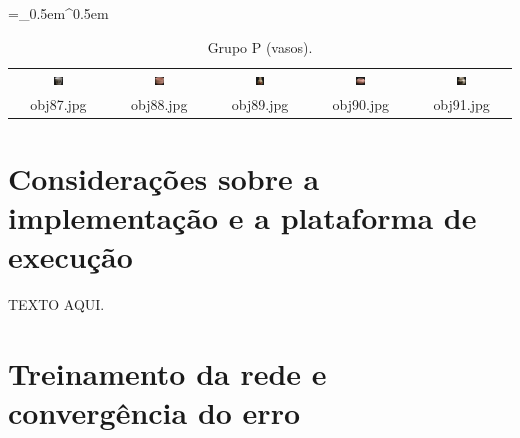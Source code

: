 \begin{table}[H]
  \centering
  \caption{Grupo P (vasos).}
  \tabulinesep =_0.5em^0.5em
  \everyrow{\tabucline[0.4pt]-}
  \begin{tabu}{|ccccc|}
    \includegraphics[width=0.1\textwidth,height=0.1\textwidth]{imagens/coil_100/vasos/obj18__0.png} &
    \includegraphics[width=0.1\textwidth,height=0.1\textwidth]{imagens/coil_100/vasos/obj25__0.png} &
    \includegraphics[width=0.1\textwidth,height=0.1\textwidth]{imagens/coil_100/vasos/obj30__0.png} &
    \includegraphics[width=0.1\textwidth,height=0.1\textwidth]{imagens/coil_100/vasos/obj56__0.png} &
    \includegraphics[width=0.1\textwidth,height=0.1\textwidth]{imagens/coil_100/vasos/obj58__0.png}
    \\
    \scriptsize{obj87.jpg} & \scriptsize{obj88.jpg} & \scriptsize{obj89.jpg} &
    \scriptsize{obj90.jpg} & \scriptsize{obj91.jpg}
  \end{tabu}
\end{table}

\section{Considerações sobre a implementação e a plataforma de execução}

TEXTO AQUI.

\section{Treinamento da rede e convergência do erro}

